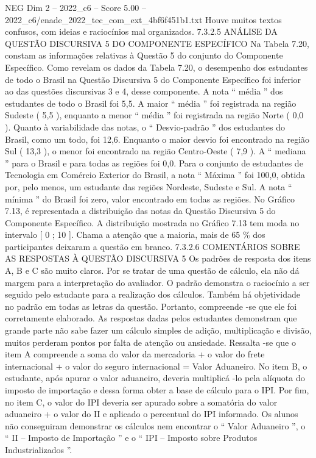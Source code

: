 \begin{textsample}{NEG Dim 2 – 2022\_c6 – Score 5.00 – 2022\_c6/enade\_2022\_tec\_com\_ext\_4bf6f451b1.txt}
Houve muitos textos confusos, com ideias e raciocínios mal organizados. 7.3.2.5 ANÁLISE DA QUESTÃO DISCURSIVA 5 DO COMPONENTE ESPECÍFICO Na Tabela 7.20, constam as informações relativas à Questão 5 do conjunto do Componente Específico.
Como revelam os dados da Tabela 7.20, o desempenho dos estudantes de todo o Brasil na Questão Discursiva 5 do Componente Específico foi inferior ao das questões discursivas 3 e 4, desse componente.
A nota “ média ” dos estudantes de todo o Brasil foi 5,5.
A maior “ média ” foi registrada na região Sudeste ( 5,5 ), enquanto a menor “ média ” foi registrada na região Norte ( 0,0 ).
Quanto à variabilidade das notas, o “ Desvio-padrão ” dos estudantes do Brasil, como um todo, foi 12,6.
Enquanto o maior desvio foi encontrado na região Sul ( 13,3 ), o menor foi encontrado na região Centro-Oeste ( 7,9 ).
A “ mediana ” para o Brasil e para todas as regiões foi 0,0.
Para o conjunto de estudantes de Tecnologia em Comércio Exterior do Brasil, a nota “ Máxima ” foi 100,0, obtida por, pelo menos, um estudante das regiões Nordeste, Sudeste e Sul.
A nota “ mínima ” do Brasil foi zero, valor encontrado em todas as regiões.
No Gráfico 7.13, é representada a distribuição das notas da Questão Discursiva 5 do Componente Específico.
A distribuição mostrada no Gráfico 7.13 tem moda no intervalo [ 0 ; 10 ].
Chama a atenção que a maioria, mais de 65 \% dos participantes deixaram a questão em branco. 7.3.2.6 COMENTÁRIOS SOBRE AS RESPOSTAS À QUESTÃO DISCURSIVA 5 Os padrões de resposta dos itens A, B e C são muito claros.
Por se tratar de uma questão de cálculo, ela não dá margem para a interpretação do avaliador.
O padrão demonstra o raciocínio a ser seguido pelo estudante para a realização dos cálculos.
Também há objetividade no padrão em todas as letras da questão.
Portanto, compreende -se que ele foi corretamente elaborado.
As respostas dadas pelos estudantes demonstram que grande parte não sabe fazer um cálculo simples de adição, multiplicação e divisão, muitos perderam pontos por falta de atenção ou ansiedade.
Ressalta -se que o item A compreende a soma do valor da mercadoria + o valor do frete internacional + o valor do seguro internacional = Valor Aduaneiro.
No item B, o estudante, após apurar o valor aduaneiro, deveria multiplicá -lo pela alíquota do imposto de importação e dessa forma obter a base de cálculo para o IPI.
Por fim, no item C, o valor do IPI deveria ser apurado sobre a somatória do valor aduaneiro + o valor do II e aplicado o percentual do IPI informado.
Os alunos não conseguiram demonstrar os cálculos nem encontrar o “ Valor Aduaneiro ”, o “ II – Imposto de Importação ” e o “ IPI – Imposto sobre Produtos Industrializados ”.

\end{textsample}
